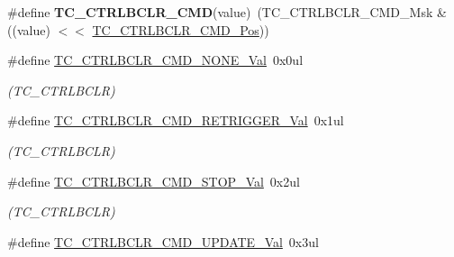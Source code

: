 \begin{DoxyCompactItemize}
\item 
\hypertarget{group___s_a_m_l21___t_c_ga2380e2dc3ff978035a625abf623e7ba3}{}\#define {\bfseries T\+C\+\_\+\+C\+T\+R\+L\+B\+C\+L\+R\+\_\+\+C\+M\+D}(value)~(T\+C\+\_\+\+C\+T\+R\+L\+B\+C\+L\+R\+\_\+\+C\+M\+D\+\_\+\+Msk \& ((value) $<$$<$ \hyperlink{group___s_a_m_l21___t_c_gab48aaea729baf61fabeb52131fb7aac2}{T\+C\+\_\+\+C\+T\+R\+L\+B\+C\+L\+R\+\_\+\+C\+M\+D\+\_\+\+Pos}))\label{group___s_a_m_l21___t_c_ga2380e2dc3ff978035a625abf623e7ba3}

\item 
\hypertarget{group___s_a_m_l21___t_c_ga13574095985ab7e7e6565d52278521ce}{}\#define \hyperlink{group___s_a_m_l21___t_c_ga13574095985ab7e7e6565d52278521ce}{T\+C\+\_\+\+C\+T\+R\+L\+B\+C\+L\+R\+\_\+\+C\+M\+D\+\_\+\+N\+O\+N\+E\+\_\+\+Val}~0x0ul\label{group___s_a_m_l21___t_c_ga13574095985ab7e7e6565d52278521ce}

\begin{DoxyCompactList}\small\item\em (T\+C\+\_\+\+C\+T\+R\+L\+B\+C\+L\+R) \end{DoxyCompactList}\item 
\hypertarget{group___s_a_m_l21___t_c_ga5001acd1fad5be8f189902a3f7829d59}{}\#define \hyperlink{group___s_a_m_l21___t_c_ga5001acd1fad5be8f189902a3f7829d59}{T\+C\+\_\+\+C\+T\+R\+L\+B\+C\+L\+R\+\_\+\+C\+M\+D\+\_\+\+R\+E\+T\+R\+I\+G\+G\+E\+R\+\_\+\+Val}~0x1ul\label{group___s_a_m_l21___t_c_ga5001acd1fad5be8f189902a3f7829d59}

\begin{DoxyCompactList}\small\item\em (T\+C\+\_\+\+C\+T\+R\+L\+B\+C\+L\+R) \end{DoxyCompactList}\item 
\hypertarget{group___s_a_m_l21___t_c_ga292d724ca99517e1c24fb52c4757b0cb}{}\#define \hyperlink{group___s_a_m_l21___t_c_ga292d724ca99517e1c24fb52c4757b0cb}{T\+C\+\_\+\+C\+T\+R\+L\+B\+C\+L\+R\+\_\+\+C\+M\+D\+\_\+\+S\+T\+O\+P\+\_\+\+Val}~0x2ul\label{group___s_a_m_l21___t_c_ga292d724ca99517e1c24fb52c4757b0cb}

\begin{DoxyCompactList}\small\item\em (T\+C\+\_\+\+C\+T\+R\+L\+B\+C\+L\+R) \end{DoxyCompactList}\item 
\hypertarget{group___s_a_m_l21___t_c_ga95411bb7c71688976ba81dfd9769528d}{}\#define \hyperlink{group___s_a_m_l21___t_c_ga95411bb7c71688976ba81dfd9769528d}{T\+C\+\_\+\+C\+T\+R\+L\+B\+C\+L\+R\+\_\+\+C\+M\+D\+\_\+\+U\+P\+D\+A\+T\+E\+\_\+\+Val}~0x3ul\label{group___s_a_m_l21___t_c_ga95411bb7c71688976ba81dfd9769528d}


\end{DoxyCompactItemize}
